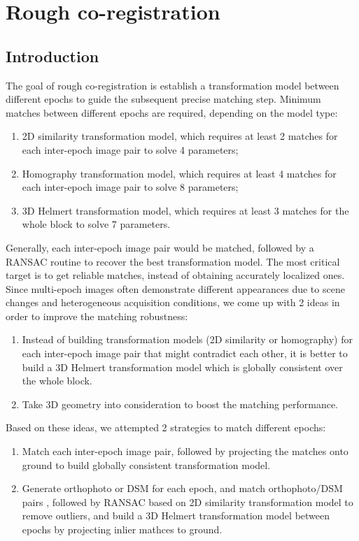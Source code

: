 
\chapter{Rough co-registration}
\label{chap:intro}
\minitoc

\section{Introduction}
The goal of rough co-registration is establish a transformation model between different epochs to guide the subsequent precise matching step. Minimum matches between different epochs are required, depending on the model type:\\
\begin{enumerate}
    \item 2D similarity transformation model, which requires at least 2 matches for each inter-epoch image pair to solve 4 parameters;
    \item Homography transformation model, which requires at least 4 matches for each inter-epoch image pair to solve 8 parameters;
    \item 3D Helmert transformation model, which requires at least 3 matches for the whole block to solve 7 parameters.
\end{enumerate}
Generally, each inter-epoch image pair would be matched, followed by a RANSAC routine to recover the best transformation model.
The most critical target is to get reliable matches, instead of obtaining accurately localized ones.
Since multi-epoch images often demonstrate different appearances due to scene changes and heterogeneous acquisition conditions, we come up with 2 ideas in order to improve the matching robustness:\\
\begin{enumerate}
    \item Instead of building transformation models (2D similarity or homography) for each inter-epoch image pair that might contradict each other, it is better to build a 3D Helmert transformation model which is globally consistent over the whole block.
    \item Take 3D geometry into consideration to boost the matching performance.
\end{enumerate}
Based on these ideas, we attempted 2 strategies to match different epochs:\\
\begin{enumerate}
    \item Match each inter-epoch image pair, followed by projecting the matches onto ground to build globally consistent transformation model.
    \item Generate orthophoto or DSM for each epoch, and match orthophoto/DSM pairs
    , followed by RANSAC based on 2D similarity transformation model to remove outliers, and build a 3D Helmert transformation model between epochs by projecting inlier mathces to ground.
\end{enumerate}

